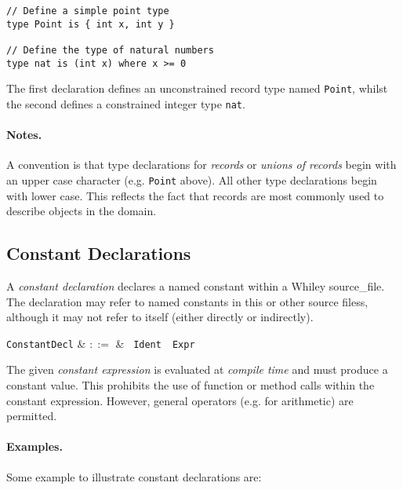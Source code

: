 \begin{lstlisting}
// Define a simple point type
type Point is { int x, int y }

// Define the type of natural numbers
type nat is (int x) where x >= 0
\end{lstlisting}

The first declaration defines an unconstrained record type named
\lstinline{Point}, whilst the second defines a constrained integer
type \lstinline{nat}.

\paragraph{Notes.}  A convention is that type declarations for {\em
  records} or {\em unions of records} begin with an upper case
character (e.g. \lstinline{Point} above).  All other type declarations
begin with lower case.  This reflects the fact that records are most
commonly used to describe objects in the domain.


\subsection{Constant Declarations}
\label{c_source_files_constant_decl}

A {\em constant declaration} declares a named constant within a Whiley
\gls{source_file}.  The declaration may refer to named constants in this
or other source filess, although it may not refer to itself (either
directly or indirectly).

\begin{syntax}
  \verb+ConstantDecl+ & $::=$ & \ \verb+Ident+\
  \ \verb+Expr+\\
\end{syntax}

The given {\em constant expression} is evaluated at {\em compile time}
and must produce a constant value.  This prohibits the use of function
or method calls within the constant expression.  However, general
operators (e.g. for arithmetic) are permitted.

\paragraph{Examples.}  Some example to illustrate constant
declarations are:

